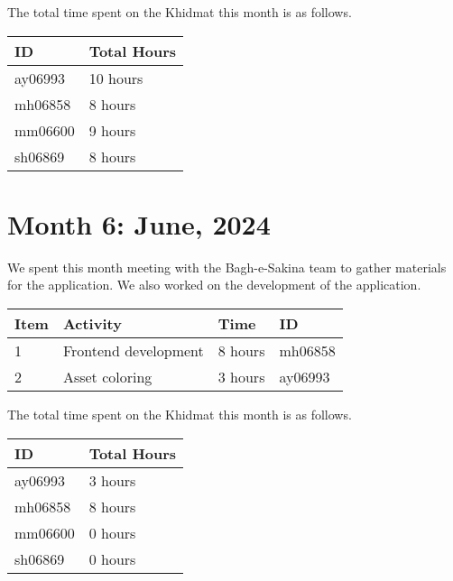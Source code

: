 \documentclass{article}
\begin{document}
\noindent The total time spent on the Khidmat this month is as follows.

\vspace{1em}

\noindent \begin{tabular}{|l|l|}
  \hline
  ID & Total Hours \\\hline
  ay06993 & 10 hours \\ \hline
  mh06858 & 8 hours  \\ \hline
  mm06600 & 9 hours \\ \hline
  sh06869 & 8 hours \\ \hline
\end{tabular}

\newpage %
\section*{Month 6: June, 2024}

We spent this month meeting with the Bagh-e-Sakina team to gather materials for the application. We also worked on the development of the application.

\vspace{1em}

\noindent \begin{tabular}{|l|l|l|l|}
  \hline
  Item & Activity & Time & ID \\ \hline
  1    & Frontend development & 8 hours  & mh06858 \\ \hline
  2 & Asset coloring & 3 hours & ay06993 \\ \hline
\end{tabular}

\vspace{1em}

\noindent The total time spent on the Khidmat this month is as follows.

\vspace{1em}

\noindent \begin{tabular}{|l|l|}
  \hline
  ID      & Total Hours \\\hline
  ay06993 & 3 hours    \\\hline
  mh06858 & 8 hours    \\\hline
  mm06600 & 0 hours    \\\hline
  sh06869 & 0 hours    \\\hline
\end{tabular}
\end{document}
